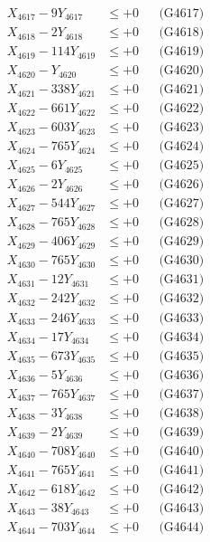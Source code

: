 \documentclass[a4paper,10pt]{article}
\begin{document}
{\begin{align}
X_{4617} - 9Y_{4617} &\leq +0 && \text{(G4617)} \\
X_{4618} - 2Y_{4618} &\leq +0 && \text{(G4618)} \\
X_{4619} - 114Y_{4619} &\leq +0 && \text{(G4619)} \\
X_{4620} - Y_{4620} &\leq +0 && \text{(G4620)} \\
\allowbreak
X_{4621} - 338Y_{4621} &\leq +0 && \text{(G4621)} \\
X_{4622} - 661Y_{4622} &\leq +0 && \text{(G4622)} \\
X_{4623} - 603Y_{4623} &\leq +0 && \text{(G4623)} \\
X_{4624} - 765Y_{4624} &\leq +0 && \text{(G4624)} \\
X_{4625} - 6Y_{4625} &\leq +0 && \text{(G4625)} \\
X_{4626} - 2Y_{4626} &\leq +0 && \text{(G4626)} \\
X_{4627} - 544Y_{4627} &\leq +0 && \text{(G4627)} \\
X_{4628} - 765Y_{4628} &\leq +0 && \text{(G4628)} \\
X_{4629} - 406Y_{4629} &\leq +0 && \text{(G4629)} \\
X_{4630} - 765Y_{4630} &\leq +0 && \text{(G4630)} \\
\allowbreak
X_{4631} - 12Y_{4631} &\leq +0 && \text{(G4631)} \\
X_{4632} - 242Y_{4632} &\leq +0 && \text{(G4632)} \\
X_{4633} - 246Y_{4633} &\leq +0 && \text{(G4633)} \\
X_{4634} - 17Y_{4634} &\leq +0 && \text{(G4634)} \\
X_{4635} - 673Y_{4635} &\leq +0 && \text{(G4635)} \\
X_{4636} - 5Y_{4636} &\leq +0 && \text{(G4636)} \\
X_{4637} - 765Y_{4637} &\leq +0 && \text{(G4637)} \\
X_{4638} - 3Y_{4638} &\leq +0 && \text{(G4638)} \\
X_{4639} - 2Y_{4639} &\leq +0 && \text{(G4639)} \\
X_{4640} - 708Y_{4640} &\leq +0 && \text{(G4640)} \\
\allowbreak
X_{4641} - 765Y_{4641} &\leq +0 && \text{(G4641)} \\
X_{4642} - 618Y_{4642} &\leq +0 && \text{(G4642)} \\
X_{4643} - 38Y_{4643} &\leq +0 && \text{(G4643)} \\
X_{4644} - 703Y_{4644} &\leq +0 && \text{(G4644)} \\

\end{align}}
\end{document}
